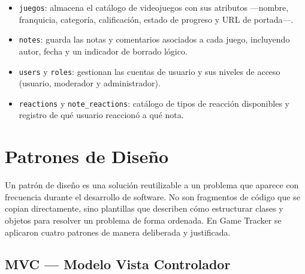 \begin{itemize}
    \item \texttt{juegos}: almacena el catálogo de videojuegos con sus
    atributos —nombre, franquicia, categoría, calificación, estado de progreso
    y URL de portada—.
    \item \texttt{notes}: guarda las notas y comentarios asociados a cada
    juego, incluyendo autor, fecha y un indicador de borrado lógico.
    \item \texttt{users} y \texttt{roles}: gestionan las cuentas de usuario
    y sus niveles de acceso (usuario, moderador y administrador).
    \item \texttt{reactions} y \texttt{note\_reactions}: catálogo de tipos de
    reacción disponibles y registro de qué usuario reaccionó a qué nota.
\end{itemize}

\section{Patrones de Diseño}

Un patrón de diseño es una solución reutilizable a un problema que aparece con
frecuencia durante el desarrollo de software. No son fragmentos de código que
se copian directamente, sino plantillas que describen cómo estructurar clases
y objetos para resolver un problema de forma ordenada. En Game Tracker se
aplicaron cuatro patrones de manera deliberada y justificada.

\subsection{MVC — Modelo Vista Controlador}

